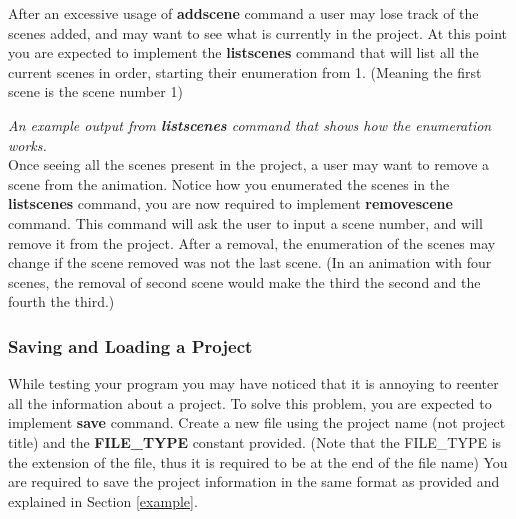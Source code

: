 \documentclass[a4paper]{article}
\begin{document}
	After an excessive usage of \textbf{addscene} command a user may lose track of the scenes added, and may want to see what is currently in the project. At this point you are expected to implement the \textbf{listscenes} command that will list all the current scenes in order, starting their enumeration from 1. (Meaning the first scene is the scene number 1) \\
	
	\begin{center}
	\end{center}
	\emph{An example output from \textbf{listscenes} command that shows how the enumeration works.}\\
	
	Once seeing all the scenes present in the project, a user may want to remove a scene from the animation. Notice how you enumerated the scenes in the \textbf{listscenes} command, you are now required to implement \textbf{removescene} command. This command will ask the user to input a scene number, and will remove it from the project. After a removal, the enumeration of the scenes may change if the scene removed was not the last scene. (In an animation with four scenes, the removal of second scene would make the third the second and the fourth the third.) \\
	
	\subsubsection{Saving and Loading a Project}

	While testing your program you may have noticed that it is annoying to reenter all the information about a project. To solve this problem, you are expected to implement \textbf{save} command. Create a new file using the project name (not project title) and the \textbf{FILE\_TYPE} constant provided. (Note that the FILE\_TYPE is the extension of the file, thus it is required to be at the end of the file name) You are required to save the project information in the same format as provided and explained in Section \ref{example}. \\
	
\end{document}
